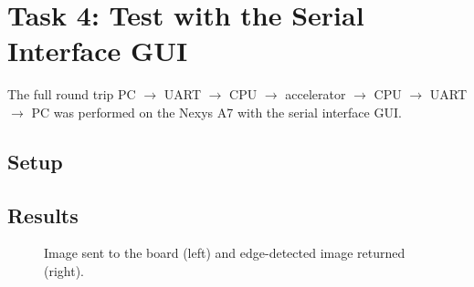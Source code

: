 \section{Task 4: Test with the Serial Interface GUI} \label{sec:task4}

The full round trip PC $\rightarrow$ UART $\rightarrow$ CPU $\rightarrow$ accelerator $\rightarrow$ CPU $\rightarrow$ UART $\rightarrow$ PC was performed on the Nexys A7 with the serial interface GUI.

\subsection{Setup}


\subsection{Results}


\begin{figure}[H]
    \centering
    \caption{Image sent to the board (left) and edge-detected image returned (right).}
    \label{fig:task4_images}
\end{figure}
